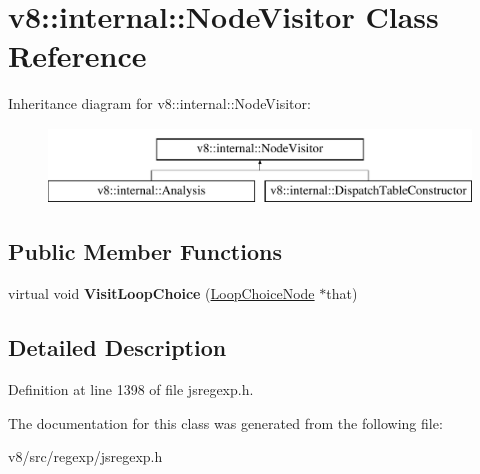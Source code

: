 \hypertarget{classv8_1_1internal_1_1NodeVisitor}{}\section{v8\+:\+:internal\+:\+:Node\+Visitor Class Reference}
\label{classv8_1_1internal_1_1NodeVisitor}
Inheritance diagram for v8\+:\+:internal\+:\+:Node\+Visitor\+:\begin{figure}[H]
\begin{center}
\leavevmode
\includegraphics[height=2.000000cm]{classv8_1_1internal_1_1NodeVisitor}
\end{center}
\end{figure}
\subsection*{Public Member Functions}
\begin{DoxyCompactItemize}
\item 
\mbox{\label{classv8_1_1internal_1_1NodeVisitor_a0181d645b844eb3fdbfe3defa7277aed}} 
virtual void {\bfseries Visit\+Loop\+Choice} (\mbox{\hyperlink{classv8_1_1internal_1_1LoopChoiceNode}{Loop\+Choice\+Node}} $\ast$that)
\end{DoxyCompactItemize}


\subsection{Detailed Description}


Definition at line 1398 of file jsregexp.\+h.



The documentation for this class was generated from the following file\+:\begin{DoxyCompactItemize}
\item 
v8/src/regexp/jsregexp.\+h\end{DoxyCompactItemize}
